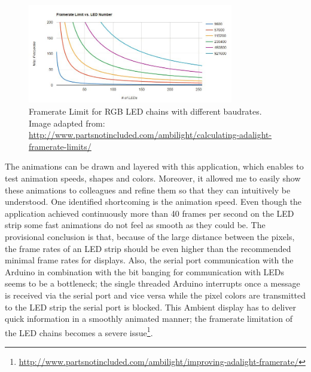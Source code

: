 \begin{figure}
    \includegraphics[width=0.8\textwidth]{fig/FPS.JPG}
    \caption[Framerate Limit of RGB LEDs]{Framerate Limit for RGB LED chains with different baudrates. Image adapted from: \url{http://www.partsnotincluded.com/ambilight/calculating-adalight-framerate-limits/}}
    \label{fig:FPS}
\end{figure}

The animations can be drawn and layered with this application, which enables to test  animation speeds, shapes and colors. Moreover, it allowed me to easily show these animations to colleagues and refine them so that they can intuitively be understood. One identified shortcoming is the animation speed. Even though the application achieved continuously more than 40 frames per second on the LED strip some fast animations do not feel as smooth as they could be. The provisional conclusion is that, because of the large distance between the pixels, the frame rates of an LED strip should be even higher than the recommended minimal frame rates for displays. Also, the serial port communication with the Arduino in combination with the bit banging for communication with LEDs seems to be a bottleneck; the single threaded Arduino interrupts once a message is received via the serial port and vice versa while the pixel colors are transmitted to the LED strip the serial port is blocked. This Ambient display has to deliver quick information in a smoothly animated manner; the framerate limitation of the LED chains becomes a severe issue\footnote{\url{http://www.partsnotincluded.com/ambilight/improving-adalight-framerate/}}. 

